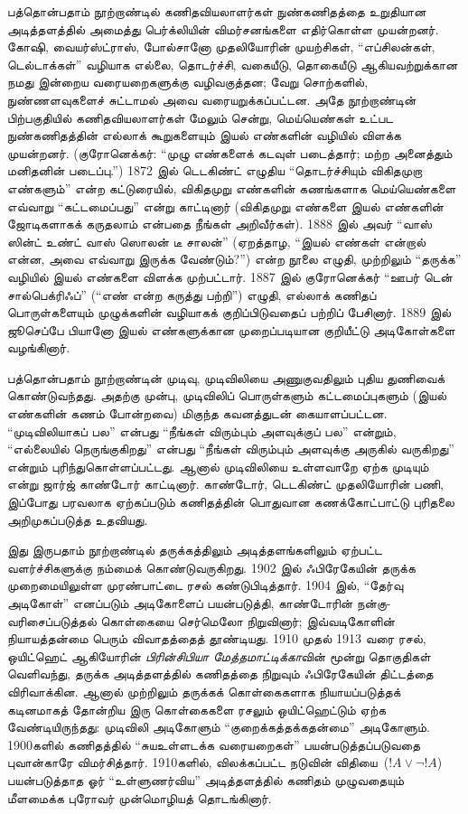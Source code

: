 \documentclass[../../../include/open-logic-section]{subfiles}
\begin{document}
பத்தொன்பதாம் நூற்றாண்டில் கணிதவியலாளர்கள் நுண்கணிதத்தை உறுதியான அடித்தளத்தில்
அமைத்து பெர்க்லியின் விமர்சனங்களை எதிர்கொள்ள முயன்றனர். கோஷி, வையர்ஸ்ட்ராஸ்,
போல்சானோ முதலியோரின் முயற்சிகள், ``எப்சிலன்கள், டெல்டாக்கள்'' வழியாக
எல்லை, தொடர்ச்சி, வகையீடு, தொகையீடு ஆகியவற்றுக்கான நமது இன்றைய
வரையறைகளுக்கு வழிவகுத்தன; வேறு சொற்களில், நுண்ணளவுகளைச் சுட்டாமல் அவை
வரையறுக்கப்பட்டன. அதே நூற்றாண்டின் பிற்பகுதியில் கணிதவியலாளர்கள் மேலும்
சென்று, மெய்யெண்கள் உட்பட நுண்கணிதத்தின் எல்லாக் கூறுகளையும் இயல் எண்களின்
வழியில் விளக்க முயன்றனர். (குரோனெக்கர்: ``முழு எண்களைக் கடவுள் படைத்தார்;
மற்ற அனைத்தும் மனிதனின் படைப்பு.'') 1872 இல் டெடகிண்ட் எழுதிய
``தொடர்ச்சியும் விகிதமுறா எண்களும்'' என்ற கட்டுரையில், விகிதமுறு எண்களின்
கணங்களாக மெய்யெண்களை எவ்வாறு ``கட்டமைப்பது'' என்று காட்டினார் (விகிதமுறு
எண்களை இயல் எண்களின் ஜோடிகளாகக் கருதலாம் என்பதை நீங்கள் அறிவீர்கள்).
1888 இல் அவர் ``வாஸ் ஸின்ட் உண்ட் வாஸ் ஸொலன் டீ சாலன்'' (ஏறத்தாழ,
``இயல் எண்கள் என்றால் என்ன, அவை எவ்வாறு இருக்க வேண்டும்?'') என்ற நூலை
எழுதி, முற்றிலும் ``தருக்க'' வழியில் இயல் எண்களை விளக்க முற்பட்டார். 1887
இல் குரோனெக்கர் ``ஊபர் டென் சால்பெக்ரிஃப்'' (``எண் என்ற கருத்து பற்றி'')
எழுதி, எல்லாக் கணிதப் பொருள்களையும் முழுக்களின் வழியாகக் குறிப்பிடுவதைப்
பற்றிப் பேசினார். 1889 இல் ஜூசெப்பே பியானோ இயல் எண்களுக்கான முறைப்படியான
குறியீட்டு அடிகோள்களை வழங்கினார்.

பத்தொன்பதாம் நூற்றாண்டின் முடிவு, முடிவிலியை அணுகுவதிலும் புதிய துணிவைக்
கொண்டுவந்தது. அதற்கு முன்பு, முடிவிலிப் பொருள்களும் கட்டமைப்புகளும் (இயல்
எண்களின் கணம் போன்றவை) மிகுந்த கவனத்துடன் கையாளப்பட்டன. ``முடிவிலியாகப்
பல'' என்பது ``நீங்கள் விரும்பும் அளவுக்குப் பல'' என்றும், ``எல்லையில்
நெருங்குகிறது'' என்பது ``நீங்கள் விரும்பும் அளவுக்கு அருகில் வருகிறது''
என்றும் புரிந்துகொள்ளப்பட்டது. ஆனால் முடிவிலியை உள்ளவாறே ஏற்க முடியும்
என்று ஜார்ஜ் காண்டோர் காட்டினார். காண்டோர், டெடகிண்ட் முதலியோரின் பணி,
இப்போது பரவலாக ஏற்கப்படும் கணிதத்தின் பொதுவான கணக்கோட்பாட்டு புரிதலை
அறிமுகப்படுத்த உதவியது.

இது இருபதாம் நூற்றாண்டில் தருக்கத்திலும் அடித்தளங்களிலும் ஏற்பட்ட
வளர்ச்சிகளுக்கு நம்மைக் கொண்டுவருகிறது. 1902 இல் ஃபிரேகேயின் தருக்க
முறைமையிலுள்ள முரண்பாட்டை ரசல் கண்டுபிடித்தார். 1904 இல், ``தேர்வு
அடிகோள்'' எனப்படும் அடிகோளைப் பயன்படுத்தி, காண்டோரின் நன்கு-வரிசைப்படுத்தல்
கொள்கையை செர்மெலோ நிறுவினார்; இவ்வடிகோளின் நியாயத்தன்மை பெரும் விவாதத்தைத்
தூண்டியது. 1910 முதல் 1913 வரை ரசல், ஒயிட்ஹெட் ஆகியோரின்
\emph{பிரின்சிபியா மேத்தமாட்டிக்கா}வின் மூன்று தொகுதிகள் வெளிவந்து,
தருக்க அடித்தளத்தில் கணிதத்தை நிறுவும் ஃபிரேகேயின் திட்டத்தை விரிவாக்கின.
ஆனால் முற்றிலும் தருக்கக் கொள்கைகளாக நியாயப்படுத்தக் கடினமாகத் தோன்றிய இரு
கொள்கைகளை ரசலும் ஒயிட்ஹெட்டும் ஏற்க வேண்டியிருந்தது: முடிவிலி அடிகோளும்
``குறைக்கத்தக்கதன்மை'' அடிகோளும். 1900களில் கணிதத்தில் ``சுயஉள்ளடக்க
வரையறைகள்'' பயன்படுத்தப்படுவதை புவான்காரே விமர்சித்தார். 1910களில்,
விலக்கப்பட்ட நடுவின் விதியை~($!A \lor \lnot !A$) பயன்படுத்தாத ஓர்
``உள்ளுணர்விய'' அடித்தளத்தில் கணிதம் முழுவதையும் மீளமைக்க புரோவர்
முன்மொழியத் தொடங்கினார்.
\end{document}

